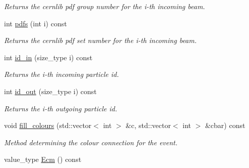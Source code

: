 \begin{DoxyCompactItemize}
\begin{DoxyCompactList}\small\item\em Returns the cernlib pdf group number for the i-\/th incoming beam. \end{DoxyCompactList}\item 
\hypertarget{a00430_a62e1c791346f96085c141a54097cfbf5}{int \hyperlink{a00430_a62e1c791346f96085c141a54097cfbf5}{pdfs} (int i) const }\label{a00430_a62e1c791346f96085c141a54097cfbf5}

\begin{DoxyCompactList}\small\item\em Returns the cernlib pdf set number for the i-\/th incoming beam. \end{DoxyCompactList}\item 
\hypertarget{a00430_ac449cf781eb308c647407c1b5d02dbf4}{int \hyperlink{a00430_ac449cf781eb308c647407c1b5d02dbf4}{id\-\_\-in} (size\-\_\-type i) const }\label{a00430_ac449cf781eb308c647407c1b5d02dbf4}

\begin{DoxyCompactList}\small\item\em Returns the i-\/th incoming particle id. \end{DoxyCompactList}\item 
\hypertarget{a00430_a299283bf13ddd94d965b46b97da53453}{int \hyperlink{a00430_a299283bf13ddd94d965b46b97da53453}{id\-\_\-out} (size\-\_\-type i) const }\label{a00430_a299283bf13ddd94d965b46b97da53453}

\begin{DoxyCompactList}\small\item\em Returns the i-\/th outgoing particle id. \end{DoxyCompactList}\item 
\hypertarget{a00430_a54043a6b6773beba5cb69313b9b589de}{void \hyperlink{a00430_a54043a6b6773beba5cb69313b9b589de}{fill\-\_\-colours} (std\-::vector$<$ int $>$ \&c, std\-::vector$<$ int $>$ \&cbar) const }\label{a00430_a54043a6b6773beba5cb69313b9b589de}

\begin{DoxyCompactList}\small\item\em Method determining the colour connection for the event. \end{DoxyCompactList}\item 
\hypertarget{a00430_a4a9bd85b0a539cf576967af09fd62bf0}{value\-\_\-type \hyperlink{a00430_a4a9bd85b0a539cf576967af09fd62bf0}{Ecm} () const }\label{a00430_a4a9bd85b0a539cf576967af09fd62bf0}


\end{DoxyCompactItemize}
